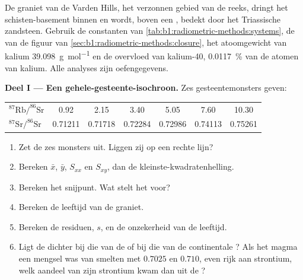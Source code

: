 \begin{problem}
\label{pb:b1:radiometric-methods:1}
De graniet van de Varden Hills, het verzonnen gebied van de reeks, dringt het schisten-basement binnen en wordt, boven een , bedekt door het Triassische zandsteen. Gebruik de constanten van \cref{tab:b1:radiometric-methods:systems}, de  van de figuur van \cref{sec:b1:radiometric-methods:closure}, het atoomgewicht van kalium \qty{39.098}{g.mol^{-1}} en de overvloed van kalium-40, \qty{0.0117}{\percent} van de atomen van kalium. Alle analyses zijn oefengegevens.

\medskip
\noindent\textbf{Deel I --- Een gehele-gesteente-isochroon.} Zes gesteentemonsters geven:
\begin{center}
\small
\begin{tabular}{|l|cccccc|}
\hline
$^{87}\mathrm{Rb}/^{86}\mathrm{Sr}$ & 0.92 & 2.15 & 3.40 & 5.05 & 7.60 & 10.30 \\
$^{87}\mathrm{Sr}/^{86}\mathrm{Sr}$ & 0.71211 & 0.71718 & 0.72284 & 0.72986 & 0.74113 & 0.75261 \\
\hline
\end{tabular}
\end{center}
\begin{enumerate}
  \item Zet de zes monsters uit. Liggen zij op een rechte lijn?
  \item Bereken $\bar x$, $\bar y$, $S_{xx}$ en $S_{xy}$, dan de kleinste-kwadratenhelling.
  \item Bereken het snijpunt. Wat stelt het voor?
  \item Bereken de leeftijd van de graniet.
  \item Bereken de residuen, $s$, en de onzekerheid van de leeftijd.
  \item Ligt de  dichter bij die van de  of bij die van de continentale ? Als het magma een mengsel was van smelten met $0.7025$ en $0.710$, even rijk aan strontium, welk aandeel van zijn strontium kwam dan uit de ?
\end{enumerate}


\end{problem}
